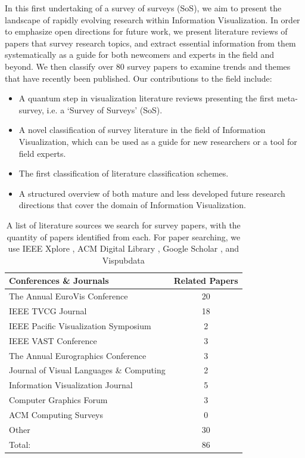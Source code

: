 In this first undertaking of a survey of surveys (SoS), we aim to present the landscape of rapidly evolving research within Information Visualization. In order to emphasize open directions for future work, we present literature reviews of papers that survey research topics, and extract essential information from them systematically as a guide for both newcomers and experts in the field and beyond. We then classify over 80 survey papers to examine trends and themes that have recently been published. Our contributions to the field include:
\begin{itemize}
\item  A quantum step in visualization literature reviews presenting the first meta-survey, i.e. a `Survey of Surveys' (SoS).
\item A novel classification of survey literature in the field of Information Visualization, which can be used as a guide for new researchers or a tool for field experts.
\item The first classification of literature classification schemes.
\item A structured overview of both mature and less developed future research directions that cover the domain of Information Visualization.
\end{itemize}

\begin{table}[t]
\footnotesize
\centering
{}
\begin{tabularx}{0.7\textwidth}{|X|c|}
\hline \rowcolor{black!15}
\textbf{Conferences \& Journals} & \textbf{Related Papers} \\ \hline
The Annual EuroVis Conference & 20  \\
IEEE TVCG Journal & 18 \\
IEEE Pacific Visualization Symposium & 2 \\
IEEE VAST Conference & 3 \\
The Annual Eurographics Conference & 3 \\
Journal of Visual Languages \& Computing & 2 \\
Information Visualization Journal & 5 \\
Computer Graphics Forum & 3 \\
ACM Computing Surveys & 0 \\
Other & 30 \\ 
\hline
\rowcolor{black!15} \centering 
Total: & 86 \\
\hline
\end{tabularx}
\caption{A list of literature sources we search for survey papers, with the quantity of papers identified from each. For paper searching, we use IEEE Xplore  \cite{ieeexplore}, ACM Digital Library \cite{acmdigitallibrary}, Google Scholar \cite{scholar}, and Vispubdata \cite{isenberg2017VPD}} \label{table:searchTable}
\end{table}

